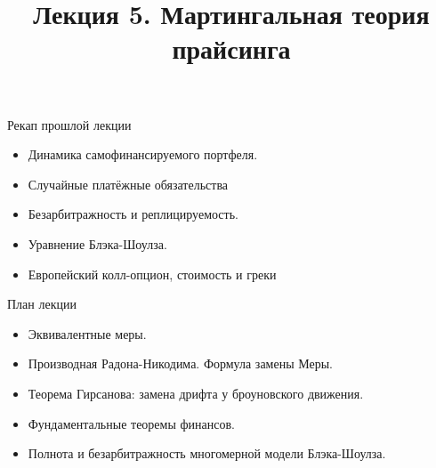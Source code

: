 \documentclass[aspectratio=169]{beamer}
\title[Мартингальная теория прайсинга]{Лекция 5. Мартингальная теория прайсинга} %
\begin{document}
\begin{frame}
\titlepage 
\end{frame}

\begin{frame}{Рекап прошлой лекции} 
\begin{itemize} 
    \item Динамика самофинансируемого портфеля.
    \item Случайные платёжные обязательства
    \item Безарбитражность и реплицируемость.
    \item Уравнение Блэка-Шоулза.
    \item Европейский колл-опцион, стоимость и греки
\end{itemize}
\end{frame}

\begin{frame}{План лекции}
    \begin{itemize}
        \item Эквивалентные меры.
        \item Производная Радона-Никодима. Формула замены Меры.
        \item Теорема Гирсанова: замена дрифта у броуновского движения.
        \item Фундаментальные теоремы финансов.
        \item Полнота и безарбитражность многомерной модели Блэка-Шоулза. 
    \end{itemize}
\end{frame}
\end{document}
